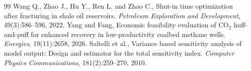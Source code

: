 \begin{thebibliography}{99}
 Wang Q., Zhao J., Hu Y., Ren L. and Zhao C., Shut-in time optimization after fracturing in shale oil reservoirs. \emph{Petroleum Exploration and Development}, 49(3):586--596, 2022.
 Yang and Fang, Economic feasibility evaluation of CO$_2$ huff-and-puff for enhanced recovery in low-productivity coalbed methane wells. \emph{Energies}, 19(11):2658, 2026.
 Saltelli et al., Variance based sensitivity analysis of model output: Design and estimator for the total sensitivity index. \emph{Computer Physics Communications}, 181(2):259--270, 2010.

\end{thebibliography}
